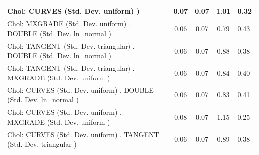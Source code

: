 \begin{table}
\begin{center}
\begin{tabular}{|l|l|c|c|c|l|}
			\hline
			 Chol: CURVES (Std. Dev. uniform) ) &  & 0.07 & 0.07 & 1.01 & 0.32 \\
			\hline
			 Chol: MXGRADE (Std. Dev. uniform) . DOUBLE (Std. Dev.   ln_normal ) &  & 0.06 & 0.07 & 0.79 & 0.43 \\
			\hline
			 Chol: TANGENT (Std. Dev. triangular) . DOUBLE (Std. Dev.   ln_normal ) &  & 0.06 & 0.07 & 0.88 & 0.38 \\
			\hline
			 Chol: TANGENT (Std. Dev. triangular) . MXGRADE (Std. Dev.   uniform ) &  & 0.06 & 0.07 & 0.84 & 0.40 \\
			\hline
			 Chol: CURVES (Std. Dev. uniform) . DOUBLE (Std. Dev.   ln_normal ) &  & 0.06 & 0.07 & 0.83 & 0.41 \\
			\hline
			 Chol: CURVES (Std. Dev. uniform) . MXGRADE (Std. Dev.   uniform ) &  & 0.08 & 0.07 & 1.15 & 0.25 \\
			\hline
			 Chol: CURVES (Std. Dev. uniform) . TANGENT (Std. Dev.   triangular ) &  & 0.06 & 0.07 & 0.89 & 0.38 \\
			\hline
		\end{tabular}
	\end{center}
\end{table}